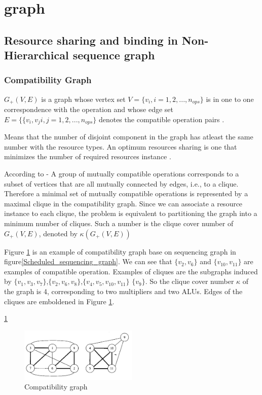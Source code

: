 \section{graph}


\subsection{Resource sharing and binding in Non-Hierarchical sequence graph}
\subsubsection{Compatibility Graph}


$G_{+}(V,E)$ is a graph whose vertex set  $  V = \{v_{i}, i = 1,2,..., n_{ops}\} $ is in one to one correspondence with the operation and whose edge set $ E = \{\{v_{i},v_{j} i,j = 1,2,...,n_{ops}\}$ denotes the compatible operation pairs \cite{b1}. 

Means that the number of disjoint component in the graph has atleast the same number with the resource types. An optimum resources sharing is one that minimizes the number of required resources instance \cite{b1}.

According to \cite{b1} - A group of mutually compatible operations corresponds to a subset of vertices that are all mutually connected by edges, i.e., to a clique. Therefore a minimal set of mutually compatible operations is represented by a maximal clique in the compatibility graph. Since we can associate a resource instance to each clique, the problem is equivalent to partitioning the graph into a minimum number of cliques. Such a number is the clique cover number of $G_{+}(V,E)  $, denoted by $\kappa(G_{+}(V,E)) $

Figure \ref{fig:Compatibility_graph} is an example of compatibility graph base on sequencing graph in figure\ref{Scheduled_sequencing_graph}. We can see that $\{v_{2},v_{6}\}  $ and $\{v_{10},v_{11}\} $ are examples of compatible operation.  Examples of cliques are the subgraphs induced by $\{v_{1},v_{3},v_{7}\}  $,$\{ v_{2},v_{6},v_{8}\} $,$\{ v_{4},v_{5}, v_{10}, v_{11}\}$ $ \{v_{9}\} $. So the clique cover number $ \kappa $ of the graph is 4, corresponding to two multipliers and two ALUs. Edges of the cliques are emboldened in Figure \ref{fig:Compatibility_graph}.


\ref{fig:Compatibility_graph}
\begin{figure}[h]
    \centering
    \includegraphics[width=0.5\textwidth]{Compatibility_graph}
    \caption{ Compatibility graph \cite{b1}}
    \label{fig:Compatibility_graph}
\end{figure}
















